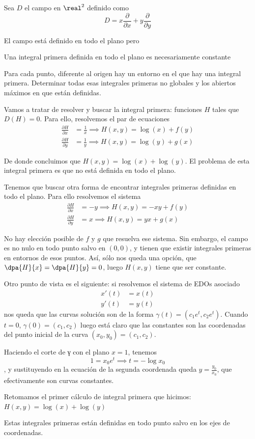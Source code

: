 \begin{problem}[2]
Sea $D$ el campo en $\real^2$ definido como
\[D=x \frac{\partial}{\partial x}+y \frac{\partial}{\partial y }\]

El campo está definido en todo el plano pero

\ppart Una integral primera definida en todo el plano es necesariamente constante

\ppart Para cada punto, diferente al origen hay un entorno en el que hay una integral primera. Determinar todas esas integrales primeras no globales y los abiertos máximos en que están definidas.
\solution


\yoP

\spart
Vamos a tratar de resolver y buscar la integral primera: funciones $H$ tales que $D(H) = 0$. Para ello, resolvemos el par de ecuaciones
\begin{align*}
\frac{\partial H}{\partial x} &= \frac{1}{x} \implies H(x,y)=\log(x)+f(y)\\
\frac{\partial H}{\partial y} &= \frac{1}{y} \implies H(x,y)=\log(y)+g(x)
\end{align*}

De donde concluimos que $H(x,y)=\log(x)+\log(y)$. El problema de esta integral primera es que no está definida en todo el plano.

Tenemos que buscar otra forma de encontrar integrales primeras definidas en todo el plano. Para ello resolvemos el sistema
\begin{align*}
\frac{\partial H}{\partial x} &= -y \implies H(x,y)=-xy+f(y)\\
\frac{\partial H}{\partial y} &= x \implies H(x,y)=yx+g(x)
\end{align*}

No hay elección posible de $f$ y $g$ que resuelva ese sistema. Sin embargo, el campo es no nulo en todo punto salvo en $(0,0)$, y tienen que existir integrales primeras en entornos de esos puntos. Así, sólo nos queda una opción, que $\dpa{H}{x} = \dpa{H}{y} = 0$, luego $H(x,y)$ tiene que ser constante.

Otro punto de vista es el siguiente: si resolvemos el sistema de EDOs asociado \begin{align*}
x'(t) &= x(t) \\
y'(t) &= y(t)
\end{align*} nos queda que las curvas solución son de la forma $γ(t) = (c_1e^t, c_2e^t)$. Cuando $t = 0$, $γ(0) = (c_1, c_2)$ luego está claro que las constantes son las coordenadas del punto inicial de la curva $(x_0, y_0) = (c_1, c_2)$.

Haciendo el corte de γ con el plano $x = 1$, tenemos \[ 1 = x_0e^t \implies t = - \log x_0 \], y sustituyendo en la ecuación de la segunda coordenada queda $y = \frac{y_0}{x_0}$, que efectivamente son curvas constantes.

\spart Retomamos el primer cálculo de integral primera que hicimos: $H(x,y)=\log(x)+\log(y)$

Estas integrales primeras están definidas en todo punto salvo en los ejes de coordenadas.

\end{problem}

